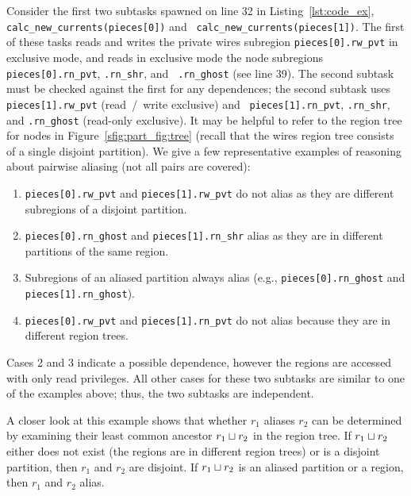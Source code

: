 Consider the first two subtasks spawned on line 32 
in Listing~\ref{lst:code_ex}, {\tt
calc\_new\_currents(pieces[0])} and {\tt
calc\_new\_currents(pieces[1])}.  The first of these tasks reads and
writes the private wires subregion {\tt pieces[0].rw\_pvt} in
exclusive mode, and reads in exclusive mode the node subregions {\tt
pieces[0].rn\_pvt}, {\tt .rn\_shr}, and {\tt
.rn\_ghost} (see line 39).  The second subtask must be
checked against the first for any dependences; the second subtask uses
{\tt pieces[1].rw\_pvt} (read~/~write exclusive) and {\tt
pieces[1].rn\_pvt}, {\tt .rn\_shr}, and {\tt .rn\_ghost} (read-only exclusive).
It may be helpful to refer to the region tree for nodes in Figure~\ref{sfig:part_fig:tree} (recall that the wires region tree consists of a single disjoint partition).  We give a few representative examples
of reasoning about pairwise aliasing (not all pairs are covered):
\begin{enumerate}
\item {\tt pieces[0].rw\_pvt} and {\tt pieces[1].rw\_pvt} do not alias as they are different subregions of a disjoint partition.
\item {\tt pieces[0].rn\_ghost} and {\tt pieces[1].rn\_shr} alias as they are in different
  partitions of the same region.
\item Subregions of an aliased partition always alias (e.g., {\tt pieces[0].rn\_ghost} and {\tt pieces[1].rn\_ghost}).
\item {\tt pieces[0].rw\_pvt} and {\tt pieces[1].rn\_pvt}
do not alias because they are in different region trees.
\end{enumerate}
Cases 2 and 3 indicate a possible dependence, however the regions are
accessed with only read privileges. All other cases for these two
subtasks are similar to one of the examples above; thus, the two
subtasks are independent.

A closer look at this example shows that whether 
$r_1$ aliases $r_2$ can be determined by examining
their least common ancestor $r_1 \sqcup r_2$ in the region tree.  
If $r_1 \sqcup r_2$ either does not exist (the regions
are in different region trees) or is a disjoint partition, then $r_1$
and $r_2$ are disjoint.  If $r_1 \sqcup r_2$ is an
aliased partition or a region, 
then $r_1$ and $r_2$ alias.

